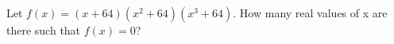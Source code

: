 Let $f(x) = (x + 64)(x^2 + 64)(x^3 + 64)$. How many real values of x are there such that $f(x) = 0$?
